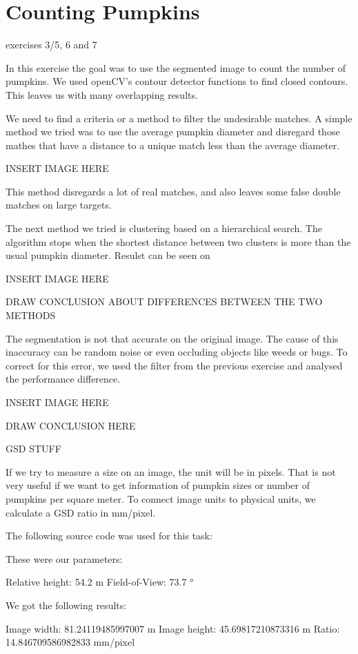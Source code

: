 \documentclass[../Head/Main.tex]{subfiles}
\begin{document}
\section{Counting Pumpkins}
exercises 3/5, 6 and 7

In this exercise the goal was to use the segmented image to count the number of pumpkins. We used openCV's contour detector functions to find closed contours. This leaves us with many overlapping results.

We need to find a criteria or a method to filter the undesirable matches. A simple method we tried was to use the average pumpkin diameter and disregard those mathes that have a distance to a unique match less than the average diameter.

INSERT IMAGE HERE

This method disregards a lot of real matches, and also leaves some false double matches on large targets.

The next method we tried is clustering based on a hierarchical search. The algorithm stops when the shortest distance between two clusters is more than the usual pumpkin diameter. Resulst can be seen on

INSERT IMAGE HERE

DRAW CONCLUSION ABOUT DIFFERENCES BETWEEN THE TWO METHODS

The segmentation is not that accurate on the original image. The cause of this inaccuracy can be random noise or even occluding objects like weeds or bugs. To correct for this error, we used the filter from the previous exercise and analysed the performance difference.

INSERT IMAGE HERE

DRAW CONCLUSION HERE

GSD STUFF

If we try to measure a size on an image, the unit will be in pixels. That is not very useful if we want to get information of pumpkin sizes or number of pumpkins per square meter. To connect image units to physical units, we calculate a GSD ratio in mm/pixel.

The following source code was used for this task:


These were our parameters:

Relative height: 54.2 m
Field-of-View: 73.7 °


We got the following results:

Image width: 81.24119485997007 m
Image height: 45.69817210873316 m
Ratio: 14.846709586982833 mm/pixel
\end{document}
